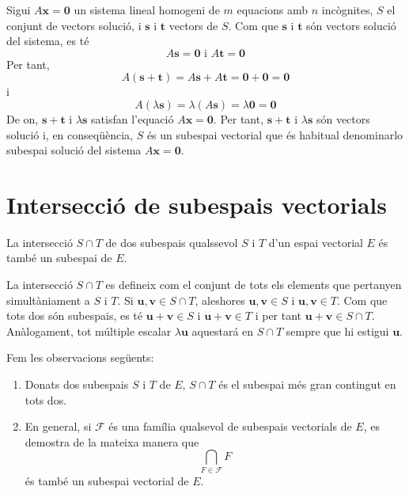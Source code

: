 \begin{solucio}
Sigui $A\mathbf{x}=\mathbf{0}$ un sistema lineal homogeni de $m$
equacions amb $n$ incògnites, $S$ el conjunt de vectors solució,
i $\mathbf{s}$ i $\mathbf{t}$ vectors de $S$. Com que $\mathbf{s}$ i $%
\mathbf{t}$ són vectors solució del sistema, es té%
\begin{equation*}
A\mathbf{s}=\mathbf{0}\text{ \ \ \ i \ \ \ }A\mathbf{t}=\mathbf{0}
\end{equation*}%
Per tant,%
\begin{equation*}
A(\mathbf{s}+\mathbf{t})=A\mathbf{s}+A\mathbf{t}=\mathbf{0}+\mathbf{0}=%
\mathbf{0}
\end{equation*}%
i%
\begin{equation*}
A\left( \lambda \mathbf{s}\right) =\lambda \left( A\mathbf{s}\right)
=\lambda \mathbf{0}=\mathbf{0}
\end{equation*}%
De on, $\mathbf{s}+\mathbf{t}$ i $\lambda \mathbf{s}$
satisfan l’equació $A\mathbf{x}=\mathbf{0}$. Per tant, $\mathbf{s}+%
\mathbf{t}$ i $\lambda \mathbf{s}$ són vectors solució i, en
conseqüència, $S$ és un subespai vectorial que és habitual denominarlo
subespai solució del sistema $A\mathbf{x}=\mathbf{0}$.
\end{solucio}

\section{Intersecció de subespais vectorials}

\begin{teorema}
La intersecció $S\cap T$ de dos subespais
qualssevol $S$ i $T$ d’un espai vectorial $E$
és també un subespai de $E$.

\end{teorema}
\begin{prova}
La intersecció $S\cap T$ es defineix com el conjunt de tots els
elements que pertanyen simultàniament a $S$ i $T$. Si $\mathbf{u},%
\mathbf{v}\in S\cap T$, aleshores $\mathbf{u},\mathbf{v}\in 
S$ i $\mathbf{u},\mathbf{v}\in T$. Com que tots dos són
subespais, es té $\mathbf{u}+\mathbf{v}\in S$ i $\mathbf{u}+%
\mathbf{v}\in T$ i per tant $\mathbf{u}+\mathbf{v}\in S%
\cap T$. Anàlogament, tot múltiple escalar $\lambda 
\mathbf{u}$ aquestará en $S\cap T$ sempre que hi estigui
$\mathbf{u}$.
\end{prova}

\begin{observacio}
Fem les observacions següents:

\begin{enumerate}
\item Donats dos subespais $S$ i $T$ de $E$, $%
S\cap T$ és el subespai més gran contingut en tots dos.

\item En general, si $\mathcal{F}$ és una família qualsevol de subespais
vectorials de $E$, es demostra de la mateixa manera que 
\begin{equation*}
\bigcap_{F\in \mathcal{F}}F
\end{equation*}%
és també un subespai vectorial de $E$.
\end{enumerate}
\end{observacio}

